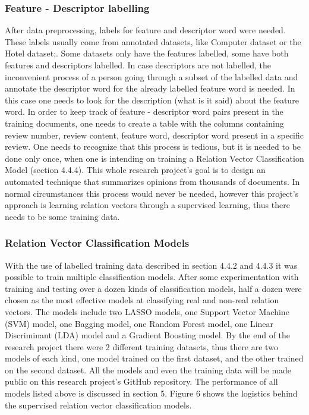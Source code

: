 \documentclass{sig-alternate}
\begin{document}
\subsubsection{Feature - Descriptor labelling}
After data preprocessing, labels for feature and descriptor word were needed. These labels usually come from annotated datasets, like Computer dataset\cite{HuLiu2004} or the Hotel dataset\cite{WangLuZhai2010};\cite{WangLuZhai2011}. Some datasets only have the features labelled, some have both features and descriptors labelled. In case descriptors are not labelled, the inconvenient process of a person going through a subset of the labelled data and annotate the descriptor word for the already labelled feature word is needed. In this case one needs to look for the description (what is it said) about the feature word. In order to keep track of feature - descriptor word pairs present in the training documents, one needs to create a table with the columns containing review number, review content, feature word, descriptor word present in a specific review. One needs to recognize that this process is tedious, but it is needed to be done only once, when one is intending on training a Relation Vector Classification Model (section 4.4.4). This whole research project's goal is to design an automated technique that summarizes opinions from thousands of documents. In normal circumstances this process would never be needed, however this project's approach is learning relation vectors through a supervised learning, thus there needs to be some training data.

\subsubsection{Relation Vector Classification Models}
With the use of labelled training data described in section 4.4.2 and 4.4.3 it was possible to train multiple classification models. After some experimentation with training and testing over a dozen kinds of classification models, half a dozen were chosen as the most effective models at classifying real and non-real relation vectors. The models include two LASSO models, one Support Vector Machine (SVM) model, one Bagging model, one Random Forest model, one Linear Discriminant (LDA) model and a Gradient Boosting model. By the end of the research project there were 2 different training datasets, thus there are two models of each kind, one model trained on the first dataset, and the other trained on the second dataset. 
All the models and even the training data will be made public on this research project's GitHub repository\cite{Eke}. The performance of all models listed above is discussed in section 5. Figure 6 shows the logistics behind the supervised relation vector classification models.
\end{document}
